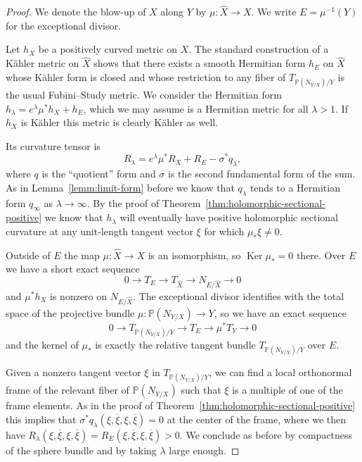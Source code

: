 \documentclass[10pt,a4paper]{amsart}
\theoremstyle{definition}
\newcommand{\kk}[1]{\mathbb{#1}}
\def\ov#1{\overline{#1}}
\DeclareMathOperator{\Ker}{Ker}
\def\kahler{K\"ahler}
\begin{document}
\begin{proof}
We denote the blow-up of $X$ along $Y$ by $\mu : \hat X \to X$.
We write $E = \mu^{-1}(Y)$ for the exceptional divisor.

Let $h_{X}$ be a positively curved metric on $X$.
The standard construction of a \kahler{} metric on $\hat X$ \cite[Proposition~3.24]{voisin2002theorie} shows that there exists a smooth Hermitian form $h_{E}$ on $\hat X$ whose \kahler{} form is closed and whose restriction to any fiber of $T_{\kk P(N_{Y/X})/Y}$ is the usual Fubini--Study metric.
We consider the Hermitian form $h_{\lambda} = e^{\lambda} \mu^{*} h_{X} + h_{E}$, which we may assume is a Hermitian metric for all $\lambda > 1$.
If $h_{X}$ is \kahler{} this metric is clearly \kahler{} as well.

Its curvature tensor is
\[
  R_{\lambda} = e^{\lambda} \mu^{*} R_{X} + R_{E} - \sigma^{*} q_{\lambda},
\]
where $q$ is the ``quotient'' form and $\sigma$ is the second fundamental form of the sum.
As in Lemma~\ref{lemm:limit-form} before we know that $q_{\lambda}$ tends to a Hermitian form $q_{\infty}$ as $\lambda \to \infty$.
By  the proof of Theorem~\ref{thm:holomorphic-sectional-positive} we know that
$h_{\lambda}$ will eventually have positive holomorphic sectional curvature at
any unit-length tangent vector $\xi$ for which $\mu_{*}\xi \not= 0$.

Outside of $E$ the map $\mu : \hat X \to X$ is an isomorphism, so $\Ker \mu_* = 0$ there.
Over $E$ we have a short exact sequence
\[
0 \longrightarrow
T_E \longrightarrow
T_{\hat X} \longrightarrow
N_{E/\hat X} \longrightarrow
0
\]
and $\mu^*h_X$ is nonzero on $N_{E/\hat X}$.
The exceptional divisor identifies with the total space of the projective
bundle $\mu : \kk P(N_{Y/X}) \to Y$, so we have an exact sequence
\[
0 \longrightarrow
T_{\kk P(N_{Y/X})/Y} \longrightarrow
T_E \longrightarrow
\mu^* T_Y \longrightarrow
0
\]
and the kernel of $\mu_{*}$ is exactly the relative tangent bundle $T_{\kk
P(N_{Y/X})/Y}$ over $E$.

Given a nonzero tangent vector $\xi$ in $T_{\kk P(N_{Y/X})/Y}$, we can find a
local orthonormal frame of the relevant fiber of $\kk P(N_{Y/X})$ such that
$\xi$ is a multiple of one of the frame elements.
As in the proof of Theorem~\ref{thm:holomorphic-sectional-positive} this implies that $\sigma^{*}q_{\lambda}(\xi, \ov\xi, \xi, \ov\xi) = 0$ at the center of the frame, where we then have
$R_{\lambda}(\xi,\ov\xi,\xi,\ov\xi) = R_{E}(\xi,\ov\xi,\xi,\ov\xi) > 0$.
We conclude as before by compactness of the sphere bundle and by taking $\lambda$ large enough.
\end{proof}










\end{document}

